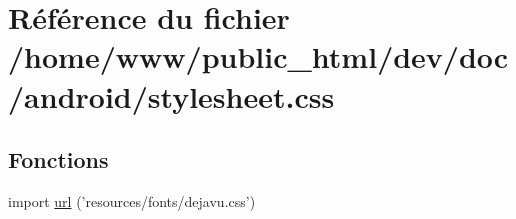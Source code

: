 \hypertarget{stylesheet_8css}{\section{Référence du fichier /home/www/public\-\_\-html/dev/doc/android/stylesheet.css}
\label{stylesheet_8css}
}
\subsection*{Fonctions}
\begin{DoxyCompactItemize}
\item 
import \hyperlink{stylesheet_8css_a415fa7808e24d8066483ae0874bd9089}{url} ('resources/fonts/dejavu.\-css')
\end{DoxyCompactItemize}
